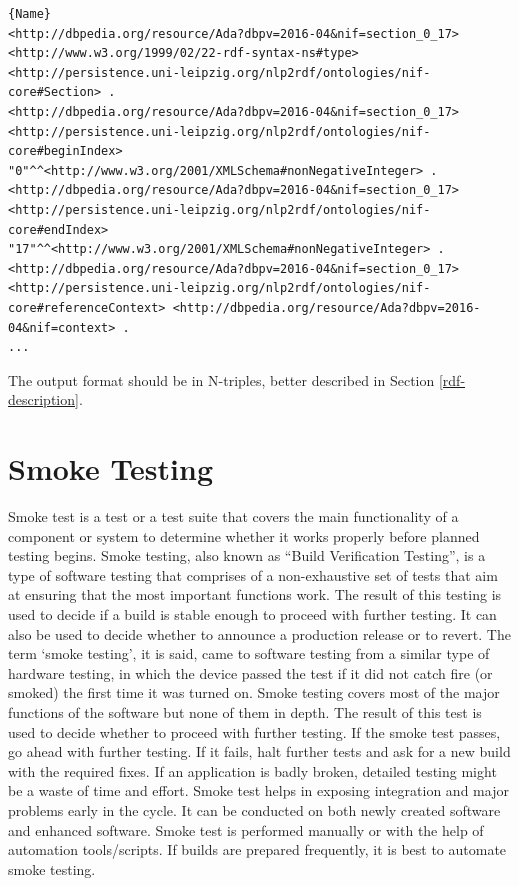 \documentclass[thesis=M,english,hidelinks]{FITthesis}[2019/12/23]
\begin{document}
\begin{lstlisting}[caption=Exemplary result for NIF Page Structure,frame=tlrb,  label = {lst:page-structure-example}]{Name}
<http://dbpedia.org/resource/Ada?dbpv=2016-04&nif=section_0_17> <http://www.w3.org/1999/02/22-rdf-syntax-ns#type> <http://persistence.uni-leipzig.org/nlp2rdf/ontologies/nif-core#Section> .
<http://dbpedia.org/resource/Ada?dbpv=2016-04&nif=section_0_17> <http://persistence.uni-leipzig.org/nlp2rdf/ontologies/nif-core#beginIndex> "0"^^<http://www.w3.org/2001/XMLSchema#nonNegativeInteger> .
<http://dbpedia.org/resource/Ada?dbpv=2016-04&nif=section_0_17> <http://persistence.uni-leipzig.org/nlp2rdf/ontologies/nif-core#endIndex> "17"^^<http://www.w3.org/2001/XMLSchema#nonNegativeInteger> .
<http://dbpedia.org/resource/Ada?dbpv=2016-04&nif=section_0_17> <http://persistence.uni-leipzig.org/nlp2rdf/ontologies/nif-core#referenceContext> <http://dbpedia.org/resource/Ada?dbpv=2016-04&nif=context> .
...
\end{lstlisting}

The output format should be in N-triples\cite{ntriples_format}, better described in Section \ref{rdf-description}.

\section{Smoke Testing}

Smoke test  is a test or a test suite that covers the main functionality of a component or system to determine whether it works properly before planned testing begins. Smoke testing, also known as “Build Verification Testing”, is a type of software testing that comprises of a non-exhaustive set of tests that aim at ensuring that the most important functions work. The result of this testing is used to decide if a build is stable enough to proceed with further testing. It can also be used to decide whether to announce a production release or to revert. The term ‘smoke testing’, it is said, came to software testing from a similar type of hardware testing, in which the device passed the test if it did not catch fire (or smoked) the first time it was turned on. Smoke testing covers most of the major functions of the software but none of them in depth. The result of this test is used to decide whether to proceed with further testing. If the smoke test passes, go ahead with further testing. If it fails, halt further tests and ask for a new build with the required fixes. If an application is badly broken, detailed testing might be a waste of time and effort. Smoke test helps in exposing integration and major problems early in the cycle. It can be conducted on both newly created software and enhanced software. Smoke test is performed manually or with the help of automation tools/scripts. If builds are prepared frequently, it is best to automate smoke testing.
\end{document}
